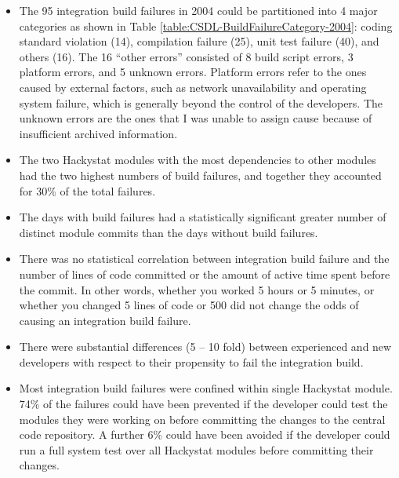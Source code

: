 \begin{itemize}
	
	\item The 95 integration build failures in 2004 could be partitioned into 4 major categories as shown in Table \ref{table:CSDL-BuildFailureCategory-2004}: coding standard violation (14), compilation failure (25), unit test failure (40), and others (16). The 16 ``other errors'' consisted of 8 build script errors, 3 platform errors, and 5 unknown errors. Platform errors refer to the ones caused by external factors, such as network unavailability and operating system failure, which is generally beyond the control of the developers. The unknown errors are the ones that I was unable to assign cause because of insufficient archived information.

	\item The two Hackystat modules with the most dependencies to other modules had the two highest numbers of build failures, and together they accounted for 30\% of the total failures.
	
	\item The days with build failures had a statistically significant greater number of distinct module commits than the days without build failures. 
	
	\item There was no statistical correlation between integration build failure and the number of lines of code committed or the amount of active time spent before the commit. In other words, whether you worked 5 hours or 5 minutes, or whether you changed 5 lines of code or 500 did not change the odds of causing an integration build failure. 
	
  \item There were substantial differences (5 -- 10 fold) between experienced and new developers with respect to their propensity to fail the integration build. 
	
	\item Most integration build failures were confined within single Hackystat module. 74\% of the failures could have been prevented if the developer could test the modules they were working on before committing the changes to the central code repository. A further 6\% could have been avoided if the developer could run a full system test over all Hackystat modules before committing their changes.	
	
\end{itemize}



